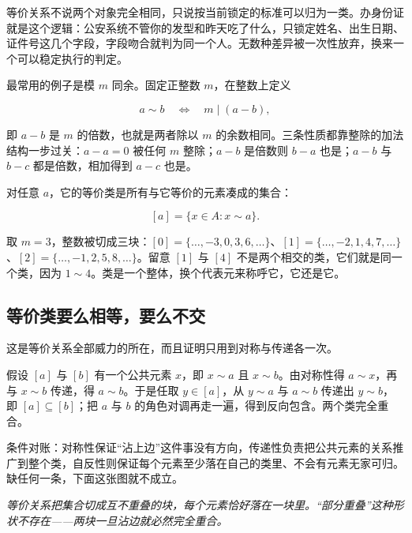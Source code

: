 等价关系不说两个对象完全相同，只说按当前锁定的标准可以归为一类。办身份证就是这个逻辑：公安系统不管你的发型和昨天吃了什么，只锁定姓名、出生日期、证件号这几个字段，字段吻合就判为同一个人。无数种差异被一次性放弃，换来一个可以稳定执行的判定。

最常用的例子是模 \(m\) 同余。固定正整数 \(m\)，在整数上定义

\[
a\sim b
\quad\Longleftrightarrow\quad
m\mid(a-b),
\]

即 \(a-b\) 是 \(m\) 的倍数，也就是两者除以 \(m\) 的余数相同。三条性质都靠整除的加法结构一步过关：\(a-a=0\) 被任何 \(m\) 整除；\(a-b\) 是倍数则 \(b-a\) 也是；\(a-b\) 与 \(b-c\) 都是倍数，相加得到 \(a-c\) 也是。

对任意 \(a\)，它的等价类是所有与它等价的元素凑成的集合：

\[
[a]=\{x\in A:x\sim a\}.
\]

取 \(m=3\)，整数被切成三块：\([0]=\{\ldots,-3,0,3,6,\ldots\}\)、\([1]=\{\ldots,-2,1,4,7,\ldots\}\)、\([2]=\{\ldots,-1,2,5,8,\ldots\}\)。留意 \([1]\) 与 \([4]\) 不是两个相交的类，它们就是同一个类，因为 \(1\sim 4\)。类是一个整体，换个代表元来称呼它，它还是它。

\subsection{等价类要么相等，要么不交}

这是等价关系全部威力的所在，而且证明只用到对称与传递各一次。

假设 \([a]\) 与 \([b]\) 有一个公共元素 \(x\)，即 \(x\sim a\) 且 \(x\sim b\)。由对称性得 \(a\sim x\)，再与 \(x\sim b\) 传递，得 \(a\sim b\)。于是任取 \(y\in[a]\)，从 \(y\sim a\) 与 \(a\sim b\) 传递出 \(y\sim b\)，即 \([a]\subseteq[b]\)；把 \(a\) 与 \(b\) 的角色对调再走一遍，得到反向包含。两个类完全重合。

条件对账：对称性保证``沾上边''这件事没有方向，传递性负责把公共元素的关系推广到整个类，自反性则保证每个元素至少落在自己的类里、不会有元素无家可归。缺任何一条，下面这张图就不成立。

\begin{center}

\emph{等价关系把集合切成互不重叠的块，每个元素恰好落在一块里。``部分重叠''这种形状不存在——两块一旦沾边就必然完全重合。}
\end{center}

